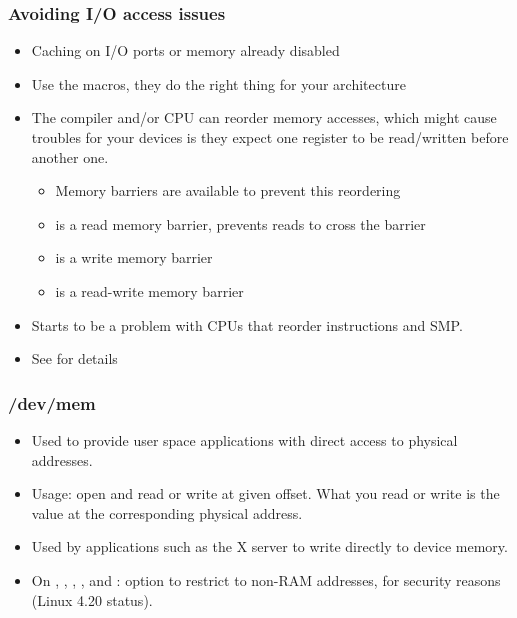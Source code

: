 \begin{frame}
  \frametitle{Avoiding I/O access issues}
  \begin{itemize}
  \item Caching on I/O ports or memory already disabled
  \item Use the macros, they do the right thing for your architecture
  \item The compiler and/or CPU can reorder memory accesses, which
    might cause troubles for your devices is they expect one register
    to be read/written before another one.
    \begin{itemize}
    \item Memory barriers are available to prevent this reordering
    \item {} is a read memory barrier, prevents reads to
      cross the barrier
    \item {} is a write memory barrier
    \item {} is a read-write memory barrier
    \end{itemize}
  \item Starts to be a problem with CPUs that reorder instructions and
    SMP.
  \item See  for details
  \end{itemize}
\end{frame}

\begin{frame}
  \frametitle{/dev/mem}
  \begin{itemize}
  \item Used to provide user space applications with direct access to
    physical addresses.
  \item Usage: open  and read or write at given offset.
    What you read or write is the value at the corresponding physical
    address.
  \item Used by applications such as the X server to write directly to
    device memory.
  \item On , , ,
    ,  and :
     option to restrict 
    to non-RAM addresses, for security reasons (Linux 4.20 status).
\end{itemize}
\end{frame}
